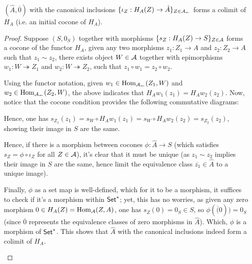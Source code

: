 \documentclass{article}
\begin{document}
\begin{lem}
    $(\hat{A},\overline{0})$ with the canonical inclusions $\{\iota_Z:H_A(Z)\rightarrow\hat{A}\}_{Z\in\cal{A}_{\twoheadleftarrow}}$ forms a colimit of $H_A$ (i.e. an initial cocone of $H_A$).
\end{lem}
\begin{proof}
    Suppose $(S,0_S)$ together with morphisms $\{s_Z:H_A(Z)\rightarrow S\}_{Z\in\cal{A}}$ forms a cocone of the functor $H_A$, given any two morphisms $z_1:Z_1\rightarrow A$ and $z_2:Z_2\rightarrow A$ such that $z_1\sim z_2$, there exists object $W\in\cal{A}$ together with epimorphisms $w_1:W\twoheadrightarrow Z_1$ and $w_2:W\twoheadrightarrow Z_2$, such that $z_1\circ w_1=z_2\circ w_2$. 

    \hfil

    Using the functor notation, given $w_1\in \mathrm{Hom}_{\cal{A}_\twoheadleftarrow}(Z_1,W)$ and $w_2\in \mathrm{Hom}_{\cal{A}_{\twoheadleftarrow}}(Z_2,W)$, the above indicates that $H_A w_1 (z_1)=H_A w_2 (z_2)$. Now, notice that the cocone condition provides the following commutative diagrams:
    \begin{center}
    \end{center}
    Hence, one has $s_{Z_1}(z_1) = s_W\circ H_A w_1(z_1)=s_W\circ H_A w_2(z_2)=s_{Z_2}(z_2)$, showing their image in $S$ are the same.

    \hfil

    Hence, if there is a morphism between cocones $\phi:\hat{A}\rightarrow S$ (which satisfies $s_{Z} = \phi\circ \iota_Z$ for all $Z\in\cal{A}$), it's clear that it must be unique (as $z_1\sim z_2$ implies their image in $S$ are the same, hence limit the equivalence class $\overline{z_1}\in \hat{A}$ to a unique image). 

    Finally, $\phi$ as a set map is well-defined, which for it to be a morphism, it suffices to check if it's a morphism within $\mathsf{Set}^*$; yet, this has no worries, as given any zero morphism $0\in H_A(Z)=\mathrm{Hom}_{\cal{A}}(Z,A)$, one has $s_Z(0) = 0_S\in S$, so $\phi(\overline(0)) = 0_S$ (since $\overline{0}$ represents the equivalence classes of zero morphisms in $\hat{A}$). Which, $\phi$ is a morphism of $\mathsf{Set}^*$. This shows that $\hat{A}$ with the canonical inclusions indeed form a colimit of $H_A$.

    \begin{center}
    \end{center}
\end{proof}
\end{document}
